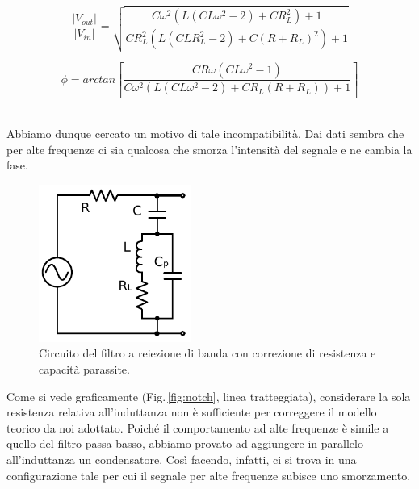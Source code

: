 \noindent
\begin{minipage}{.5\linewidth}
{\small
\begin{equation}
\frac{|V_{out}|}{|V_{in}|}=\sqrt{\frac{C \omega ^2 \left(L \left(C L \omega ^2-2\right)+C R_L^2\right)+1}{C R_L^2 \left(L \left(C L R_L^2-2\right)+C (R+R_L)^2\right)+1}}
\label{eq:notchGain_corr}
\end{equation}
}
\end{minipage}%
\begin{minipage}{.5\linewidth}
{\small
\begin{equation}
\phi=arctan\left[\frac{C R \omega \left(C L \omega ^2-1\right)}{C \omega ^2 \left(L \left(C L \omega ^2-2\right)+C R_L (R+R_L)\right)+1}\right]
\label{eq:notchPhi_corr}
\end{equation}
}
\end{minipage}\\

Abbiamo dunque cercato un motivo di tale incompatibilità. Dai dati sembra che per alte frequenze ci sia qualcosa che smorza l'intensità del segnale e ne cambia la fase.

\begin{figure}
	\centering
    \includegraphics[width=50mm]{circ2.pdf}
    \caption{Circuito del filtro a reiezione di banda con correzione di resistenza e capacità parassite.}
    \label{fig:circ2}
\end{figure}

Come si vede graficamente (Fig.$\,$\ref{fig:notch}, linea tratteggiata), considerare la sola resistenza relativa all'induttanza non è sufficiente per correggere il modello teorico da noi adottato.
Poiché il comportamento ad alte frequenze è simile a quello del filtro passa basso, abbiamo provato ad aggiungere in parallelo all'induttanza un condensatore. Così facendo, infatti, ci si trova in una configurazione tale per cui il segnale per alte frequenze subisce uno smorzamento.

